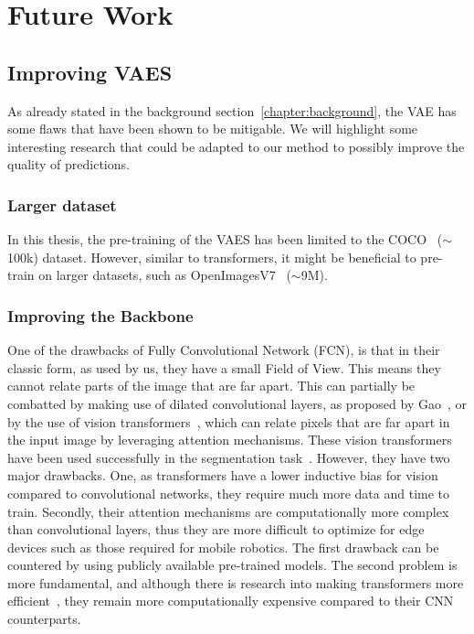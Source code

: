\chapter{Future Work}\label{chapter:future_work}

\section{Improving VAES}
As already stated in the background section~\ref{chapter:background}, the VAE has some flaws that have been shown to be mitigable. We will highlight some interesting research that could be adapted to our method to possibly improve the quality of predictions.
\subsection{Larger dataset}
In this thesis, the pre-training of the VAES has been limited to the COCO~\cite{lin2015microsoftcococommonobjects} ($\sim$100k) dataset. However, similar to transformers, it might be beneficial to pre-train on larger datasets, such as OpenImagesV7~\cite{OpenImages} ($\sim$9M).

\subsection{Improving the Backbone}
One of the drawbacks of Fully Convolutional Network (FCN), is that in their classic form, as used by us, they have a small Field of View. This means they cannot relate parts of the image that are far apart. This can partially be combatted by making use of dilated convolutional layers, as proposed by Gao~\cite{gao2023rethinking}, or by the use of vision transformers~\cite{dosovitskiy2021image}, which can relate pixels that are far apart in the input image by leveraging attention mechanisms. These vision transformers have been used successfully in the segmentation task~\cite{xie2021segformer,chen2022vision}. However, they have two major drawbacks. One, as transformers have a lower inductive bias for vision~\cite{dosovitskiy2021image} compared to convolutional networks, they require much more data and time to train. Secondly, their attention mechanisms are computationally more complex than convolutional layers, thus they are more difficult to optimize for edge devices such as those required for mobile robotics. The first drawback can be countered by using publicly available pre-trained models. The second problem is more fundamental, and although there is research into making transformers more efficient~\cite{li2022efficientformer,Yu2021MetaFormerIA}, they remain more computationally expensive compared to their CNN counterparts.

